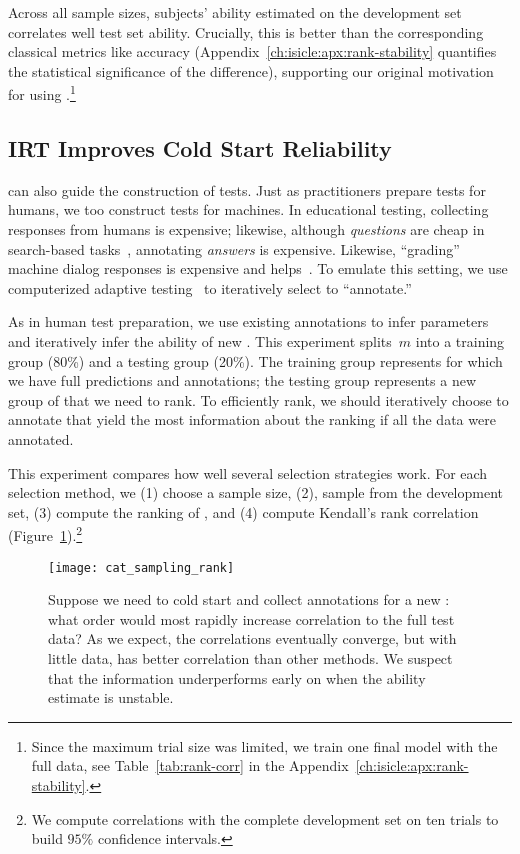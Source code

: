 Across all sample sizes, subjects' \irt{} ability estimated on the
development set correlates well test set ability.
%
Crucially, this is better than the corresponding classical metrics
like accuracy (Appendix~\ref{ch:isicle:apx:rank-stability} quantifies
the statistical significance of the difference), supporting our
original motivation for using \irt{}.\footnote{ Since the maximum trial size was
    limited, we train one final model with the full data, see
    Table~\ref{tab:rank-corr} in the
    Appendix~\ref{ch:isicle:apx:rank-stability}.  }

\subsection{IRT Improves Cold Start Reliability}
\label{ch:isicle:sampling}

\irt{} can also guide the construction of tests.
Just as \irt{} practitioners prepare tests for humans, we too construct tests for machines.
In educational testing, collecting responses from humans is expensive; likewise, although \emph{questions} are cheap in search-based \qa{} tasks~\citep{Nguyen2016MSMA,kwiatkowski2019nq}, annotating \emph{answers} is expensive.
Likewise, ``grading'' machine dialog responses is expensive and \irt{} helps~\citep{sedoc2020irt}.
To emulate this setting, we use computerized adaptive testing~\citep{weiss1984cat} to iteratively select \squad{} \itms{} to ``annotate.''

As in human test preparation, we use existing annotations to infer
\itm{} parameters and iteratively infer the ability of new \subjs{}.
%
This experiment splits~$m$ \subjs{} into a training group (80\%) and a
testing group (20\%).
%
The training group represents \subjs{} for which we have full \itm{}
predictions and annotations; the testing group represents a new group
of \subjs{} that we need to rank.
To efficiently rank, we should iteratively choose \itms{} to annotate that yield the most information about the ranking if all the data were annotated.

This experiment compares how well several \itm{} selection strategies work.
For each selection method, we (1) choose a sample size, (2), sample
from the development set, (3) compute the ranking of \subjs{}, and (4)
compute Kendall's rank correlation
(Figure~\ref{fig:stability:sampling}).\footnote{We compute correlations with the complete development set on ten trials to build $95\%$ confidence intervals.}


\begin{figure}[t]
    \centering
    \texttt{[image: cat\_sampling\_rank]}
    \caption{
        Suppose we need to cold start and collect annotations for a new \subj{}: what order would most rapidly increase correlation to the full test data?
        As we expect, the correlations eventually converge, but with little data, \irt{} has better correlation than other methods.
        We suspect that the \irt{} information underperforms early on
        when the \subj{} ability estimate is unstable.
    }
    \label{fig:stability:sampling}
\end{figure}

